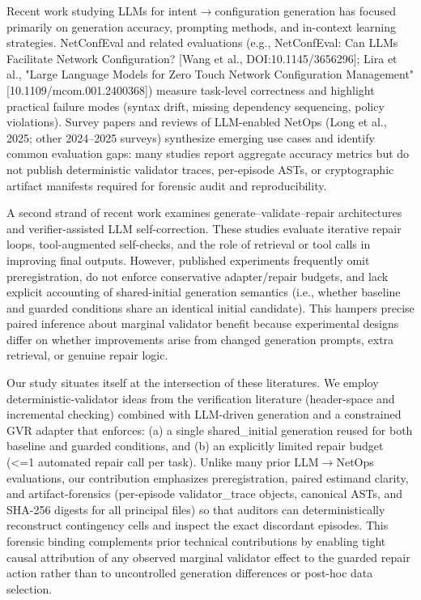 \documentclass[conference]{IEEEtran}
\begin{document}
Recent work studying LLMs for intent\ensuremath{\rightarrow}configuration generation has focused primarily on generation accuracy, prompting methods, and in-context learning strategies. NetConfEval and related evaluations (e.g., NetConfEval: Can LLMs Facilitate Network Configuration? [Wang et al., DOI:10.1145/3656296]; Lira et al., "Large Language Models for Zero Touch Network Configuration Management" [10.1109/mcom.001.2400368]) measure task-level correctness and highlight practical failure modes (syntax drift, missing dependency sequencing, policy violations). Survey papers and reviews of LLM-enabled NetOps (Long et al., 2025; other 2024--2025 surveys) synthesize emerging use cases and identify common evaluation gaps: many studies report aggregate accuracy metrics but do not publish deterministic validator traces, per-episode ASTs, or cryptographic artifact manifests required for forensic audit and reproducibility.

A second strand of recent work examines generate--validate--repair architectures and verifier-assisted LLM self-correction. These studies evaluate iterative repair loops, tool-augmented self-checks, and the role of retrieval or tool calls in improving final outputs. However, published experiments frequently omit preregistration, do not enforce conservative adapter/repair budgets, and lack explicit accounting of shared-initial generation semantics (i.e., whether baseline and guarded conditions share an identical initial candidate). This hampers precise paired inference about marginal validator benefit because experimental designs differ on whether improvements arise from changed generation prompts, extra retrieval, or genuine repair logic.

Our study situates itself at the intersection of these literatures. We employ deterministic-validator ideas from the verification literature (header-space and incremental checking) combined with LLM-driven generation and a constrained GVR adapter that enforces: (a) a single shared\_initial generation reused for both baseline and guarded conditions, and (b) an explicitly limited repair budget (<=1 automated repair call per task). Unlike many prior LLM\ensuremath{\rightarrow}NetOps evaluations, our contribution emphasizes preregistration, paired estimand clarity, and artifact-forensics (per-episode validator\_trace objects, canonical ASTs, and SHA-256 digests for all principal files) so that auditors can deterministically reconstruct contingency cells and inspect the exact discordant episodes. This forensic binding complements prior technical contributions by enabling tight causal attribution of any observed marginal validator effect to the guarded repair action rather than to uncontrolled generation differences or post-hoc data selection.
\end{document}
